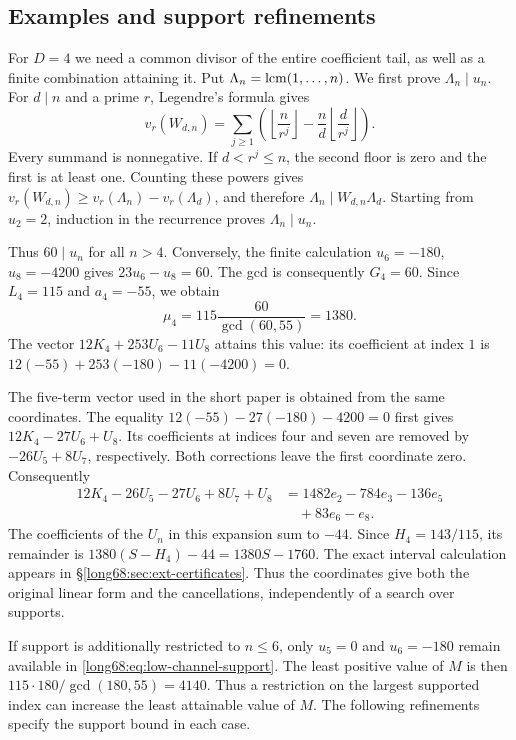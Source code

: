 \documentclass[11pt]{article}
\begin{document}
\subsection{Examples and support refinements}\label{long68:sec:basis-examples}

For $D=4$ we need a common divisor of the entire coefficient tail,
as well as a finite combination attaining it. Put
$\Lambda_n=\operatorname{lcm}(1,\ldots,n)$. We first prove $\Lambda_n\mid u_n$.
For $d\mid n$ and a prime $r$, Legendre's formula gives
\[
 v_r(W_{d,n})=\sum_{j\ge1}
 \left(\left\lfloor\frac n{r^j}\right\rfloor
       -\frac nd\left\lfloor\frac d{r^j}\right\rfloor\right).
\]
Every summand is nonnegative. If $d<r^j\le n$, the second floor
is zero and the first is at least one. Counting these powers gives
$v_r(W_{d,n})\ge v_r(\Lambda_n)-v_r(\Lambda_d)$, and therefore
$\Lambda_n\mid W_{d,n}\Lambda_d$. Starting from $u_2=2$, induction
in the recurrence proves $\Lambda_n\mid u_n$.

Thus $60\mid u_n$ for all $n>4$. Conversely, the finite calculation
$u_6=-180$, $u_8=-4200$ gives $23u_6-u_8=60$. The gcd is consequently
$G_4=60$.
Since $L_4=115$ and $a_4=-55$, we obtain
\[
 \mu_4=115\frac{60}{\gcd(60,55)}=1380.
\]
The vector $12K_4+253U_6-11U_8$ attains this value: its coefficient at
index $1$ is $12(-55)+253(-180)-11(-4200)=0$.

The five-term vector used in the short paper is obtained from the same
coordinates. The equality $12(-55)-27(-180)-4200=0$ first gives
$12K_4-27U_6+U_8$. Its coefficients at indices four and seven are
removed by $-26U_5+8U_7$, respectively. Both corrections leave the first
coordinate zero. Consequently
\begin{equation}
\begin{split}
 12K_4-26U_5-27U_6+8U_7+U_8
 &=1482e_2-784e_3-136e_5\\
 &\quad+83e_6-e_8.
\end{split}
\label{long68:eq:constructed-depth-four}
\end{equation}
The coefficients of the $U_n$ in this expansion sum to $-44$.
Since $H_4=143/115$, its remainder is
$1380(S-H_4)-44=1380S-1760$. The exact interval calculation appears
in \S\ref{long68:sec:ext-certificates}. Thus the coordinates give both
the original linear form and the cancellations, independently of a
search over supports.

If support is additionally restricted to $n\le6$, only $u_5=0$ and
$u_6=-180$ remain available in \eqref{long68:eq:low-channel-support}.
The least positive value of $M$ is then $115\cdot180/\gcd(180,55)=4140$.
Thus a restriction on the largest supported index can increase the
least attainable value of $M$. The following refinements specify the support bound in each case.
\end{document}

